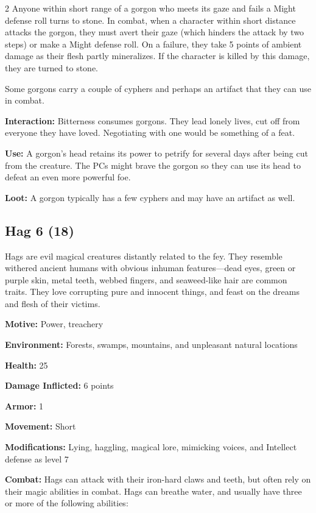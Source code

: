 \begin{multicols}{2}
Anyone within short range of a gorgon who meets its gaze and fails a Might defense roll turns to stone. In combat, when a character within short distance attacks the gorgon, they must avert their gaze (which hinders the attack by two steps) or make a Might defense roll. On a failure, they take 5 points of ambient damage as their flesh partly mineralizes. If the character is killed by this damage, they are turned to stone.

Some gorgons carry a couple of cyphers and perhaps an artifact that they can use in combat. 

\textbf{Interaction:} Bitterness consumes gorgons. They lead lonely lives, cut off from everyone they have loved. Negotiating with one would be something of a feat. 

\textbf{Use:} A gorgon’s head retains its power to petrify for several days after being cut from the creature. The PCs might brave the gorgon so they can use its head to defeat an even more powerful foe. 

\textbf{Loot:} A gorgon typically has a few cyphers and may have an artifact as well.

\subsection{Hag 6 (18)}

Hags are evil magical creatures distantly related to the fey. They resemble withered ancient humans with obvious inhuman features—dead eyes, green or purple skin, metal teeth, webbed fingers, and seaweed-like hair are common traits. They love corrupting pure and innocent things, and feast on the dreams and flesh of their victims. 

\textbf{Motive:} Power, treachery 

\textbf{Environment:} Forests, swamps, mountains, and unpleasant natural locations 

\textbf{Health:} 25 

\textbf{Damage Inflicted:} 6 points 

\textbf{Armor:} 1 

\textbf{Movement:} Short 

\textbf{Modifications:} Lying, haggling, magical lore, mimicking voices, and Intellect defense as level 7 

\textbf{Combat:} Hags can attack with their iron-hard claws and teeth, but often rely on their magic abilities in combat. Hags can breathe water, and usually have three or more of the following abilities: 


\end{multicols}

